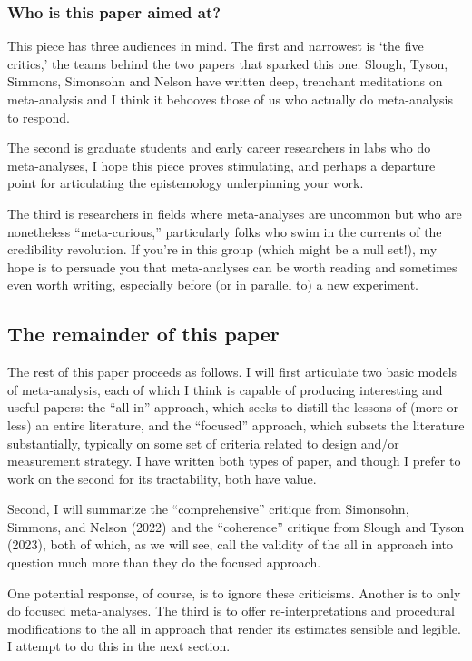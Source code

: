 \documentclass{article}
\begin{document}
\subsubsection{Who is this paper aimed
at?}\label{who-is-this-paper-aimed-at}

This piece has three audiences in mind. The first and narrowest is `the
five critics,' the teams behind the two papers that sparked this one.
Slough, Tyson, Simmons, Simonsohn and Nelson have written deep,
trenchant meditations on meta-analysis and I think it behooves those of
us who actually do meta-analysis to respond.

The second is graduate students and early career researchers in labs who
do meta-analyses, I hope this piece proves stimulating, and perhaps a
departure point for articulating the epistemology underpinning your
work.

The third is researchers in fields where meta-analyses are uncommon but
who are nonetheless ``meta-curious,'' particularly folks who swim in the
currents of the credibility revolution. If you're in this group (which
might be a null set!), my hope is to persuade you that meta-analyses can
be worth reading and sometimes even worth writing, especially before (or
in parallel to) a new experiment.

\subsection{The remainder of this
paper}\label{the-remainder-of-this-paper}

The rest of this paper proceeds as follows. I will first articulate two
basic models of meta-analysis, each of which I think is capable of
producing interesting and useful papers: the ``all in'' approach, which
seeks to distill the lessons of (more or less) an entire literature, and
the ``focused'' approach, which subsets the literature substantially,
typically on some set of criteria related to design and/or measurement
strategy. I have written both types of paper, and though I prefer to
work on the second for its tractability, both have value.

Second, I will summarize the ``comprehensive'' critique from Simonsohn,
Simmons, and Nelson (2022) and the ``coherence'' critique from Slough
and Tyson (2023), both of which, as we will see, call the validity of
the all in approach into question much more than they do the focused
approach.

One potential response, of course, is to ignore these criticisms.
Another is to only do focused meta-analyses. The third is to offer
re-interpretations and procedural modifications to the all in approach
that render its estimates sensible and legible. I attempt to do this in
the next section.
\end{document}
